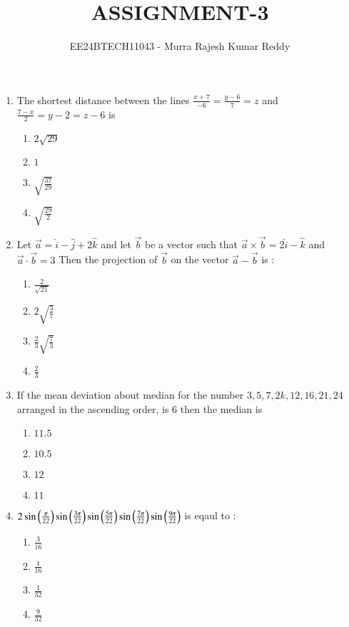 \documentclass[journal,12pt,onecolumn,article]{IEEEtran}
\theoremstyle{remark}
\begin{document}

\vspace{3cm}
\title{ASSIGNMENT-3}
\author{EE24BTECH11043 - Murra Rajesh Kumar Reddy}
\maketitle
\bigskip
\begin{enumerate}
\item The shortest distance between the lines $\frac{x+7}{-6} = \frac{y-6}{7} = z$ and $\frac{7-x}{2} = y-2 = z-6$ is 
\begin{enumerate}
\item $2\sqrt{29}$
\item $1$
\item $\sqrt{\frac{37}{29}}$
\item $\sqrt{\frac{29}{2}}$
\end{enumerate}
\item Let $\vec{a} = \hat{i}-\hat{j}+2\hat{k}$ and let $\vec{b}$ be a vector such that $\vec{a} \times \vec{b} = 2\hat{i}-\hat{k}$ and $\vec{a} \cdot \vec{b} = 3$ Then the projection of $\vec{b}$ on the vector $\vec{a}-\vec{b}$ is :
\begin{enumerate}
\item $\frac{2}{\sqrt{21}}$
\item $2\sqrt{\frac{3}{7}}$
\item $\frac{2}{3}\sqrt{\frac{7}{3}}$
\item $\frac{2}{3}$
\end{enumerate}
\item If the mean deviation about median for the number $3,5,7,2k,12,16,21,24$ arranged in the ascending order, is 6 then the median is
\begin{enumerate}
\item $11.5$
\item $10.5$
\item $12$
\item $11$
\end{enumerate}
\item $2\sin\left(\frac{\pi}{22}\right)\sin\left(\frac{3\pi}{22}\right)\sin\left(\frac{5\pi}{22}\right)\sin\left(\frac{7\pi}{22}\right)\sin\left(\frac{9\pi}{22}\right)$ is eqaul to :
\begin{enumerate}
\item $\frac{3}{16}$
\item $\frac{1}{16}$
\item $\frac{1}{32}$
\item $\frac{9}{32}$
\end{enumerate}

\end{enumerate}
\end{document}
